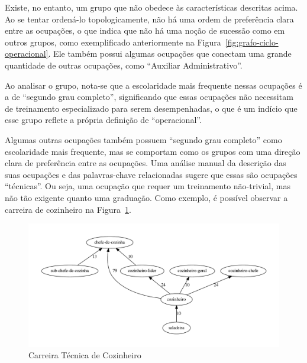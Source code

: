 \documentclass[12pt,a4paper]{article}
\begin{document}
Existe, no entanto, um grupo que não obedece às características descritas acima. Ao se tentar ordená-lo topologicamente, não há uma ordem de preferência clara entre as ocupações, o que indica que não há uma noção de sucessão como em outros grupos, como exemplificado anteriormente na Figura~\ref{fig:grafo-ciclo-operacional}. Ele também possui algumas ocupações que conectam uma grande quantidade de outras ocupações, como \enquote{Auxiliar Administrativo}.

Ao analisar o grupo, nota-se que a escolaridade mais frequente nessas ocupações é a de \enquote{segundo grau completo}, significando que essas ocupações não necessitam de treinamento especializado para serem desempenhadas, o que é um indício que esse grupo reflete a própria definição de \enquote{operacional}.

Algumas outras ocupações também possuem \enquote{segundo grau completo} como escolaridade mais frequente, mas se comportam como os grupos com uma direção clara de preferência entre as ocupações. Uma análise manual da descrição das suas ocupações e das palavras-chave relacionadas sugere que essas são ocupações \enquote{técnicas}. Ou seja, uma ocupação que requer um treinamento não-trivial, mas não tão exigente quanto uma graduação. Como exemplo, é possível observar a carreira de cozinheiro na Figura~\ref{fig:exemplo-grafo-cozinheiro}.

\begin{figure}[htb]
  \centering
  \includegraphics[scale=0.6]{subcluster_01_11.pdf}
  \caption{Carreira Técnica de Cozinheiro}
  \label{fig:exemplo-grafo-cozinheiro}
\end{figure}

\end{document}
